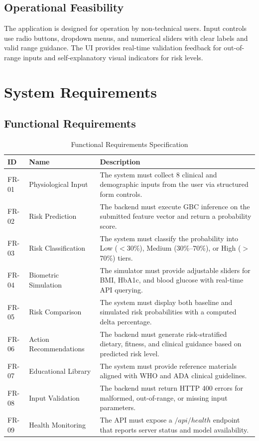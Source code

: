 \documentclass[12pt,a4paper]{report}
\begin{document}
\subsection{Operational Feasibility}
The application is designed for operation by non-technical users. Input controls use radio buttons, dropdown menus, and numerical sliders with clear labels and valid range guidance. The UI provides real-time validation feedback for out-of-range inputs and self-explanatory visual indicators for risk levels.

\section{System Requirements}

\subsection{Functional Requirements}

\begin{table}[H]
\centering
\caption{Functional Requirements Specification}
\label{tab:functional_requirements}
\begin{tabularx}{\textwidth}{llX}
\toprule
\textbf{ID} & \textbf{Name} & \textbf{Description} \\
\midrule
FR-01 & Physiological Input     & The system must collect 8 clinical and demographic inputs from the user via structured form controls. \\
FR-02 & Risk Prediction         & The backend must execute GBC inference on the submitted feature vector and return a probability score. \\
FR-03 & Risk Classification     & The system must classify the probability into Low ($<$30\%), Medium (30\%--70\%), or High ($>$70\%) tiers. \\
FR-04 & Biometric Simulation    & The simulator must provide adjustable sliders for BMI, HbA1c, and blood glucose with real-time API querying. \\
FR-05 & Risk Comparison         & The system must display both baseline and simulated risk probabilities with a computed delta percentage. \\
FR-06 & Action Recommendations  & The backend must generate risk-stratified dietary, fitness, and clinical guidance based on predicted risk level. \\
FR-07 & Educational Library     & The system must provide reference materials aligned with WHO and ADA clinical guidelines. \\
FR-08 & Input Validation        & The backend must return HTTP 400 errors for malformed, out-of-range, or missing input parameters. \\
FR-09 & Health Monitoring       & The API must expose a $/api/health$ endpoint that reports server status and model availability. \\
\bottomrule
\end{tabularx}
\end{table}
\end{document}
